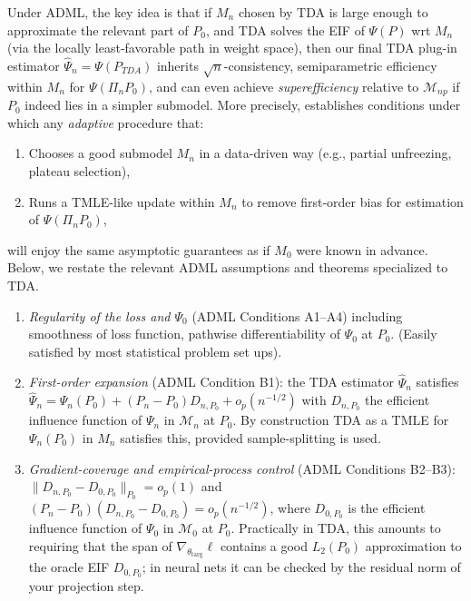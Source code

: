 \documentclass{article}
\theoremstyle{remark}
\begin{document}
Under ADML, the key idea is that if $M_n$ chosen by TDA is large enough to approximate the relevant part of $P_0$, and TDA solves the EIF of $\Psi(P)$ wrt $M_n$ (via the locally least-favorable path in weight space), then our final TDA plug-in estimator $\widehat{\Psi}_n=\Psi(P_{\textit{TDA}})$ inherits $\sqrt{n}$-consistency, semiparametric efficiency within $M_n$ for $\Psi(\Pi_nP_0)$, and can even achieve \emph{superefficiency} relative to $\mathcal{M}_{np}$ if $P_0$ indeed lies in a simpler submodel. More precisely, \cite{van2023adaptive} establishes conditions under which any \emph{adaptive} procedure that:

\begin{enumerate}[leftmargin=1em,itemsep=0pt]
\item Chooses a good submodel $M_n$ in a data-driven way (e.g., partial unfreezing, plateau selection),
\item Runs a TMLE-like update within $M_n$ to remove first-order bias for estimation of $\Psi(\Pi_nP_0)$,
\end{enumerate}

will enjoy the same asymptotic guarantees as if $M_0$ were known in advance.  Below, we restate the relevant ADML assumptions and theorems specialized to TDA.

\begin{enumerate} [leftmargin=1.5em,label=\textbf{(T\arabic*)}]
  \item\label{ass:A1A4}
        \emph{Regularity of the loss and $\Psi_0$}  
        (ADML Conditions A1–A4) including smoothness of loss function, pathwise differentiability of $\Psi_0$ at $P_0$. (Easily satisfied by most statistical problem set ups).
  \item\label{ass:B1}
        \emph{First-order expansion}  
        (ADML Condition B1):  
        the TDA estimator $\hat\Psi_n$ satisfies  
        $\hat\Psi_n=\Psi_n(P_0)+(P_n-P_0)D_{n,P_0}+o_p(n^{-1/2})$
        with $D_{n,P_0}$ the efficient influence function of
        $\Psi_n$ in $\mathcal{M}_n$ at $P_0$.  
        By construction TDA as a TMLE for $\Psi_n(P_0)$ in $M_n$ satisfies this, provided sample-splitting is used.
  \item\label{ass:B2B3}
        \emph{Gradient-coverage and empirical-process control}  
        (ADML Conditions B2–B3):  
        $\|D_{n,P_0}-D_{0,P_0}\|_{P_0}=o_p(1)$ and
        $(P_n-P_0)(D_{n,P_0}-D_{0,P_0})=o_p(n^{-1/2})$,
        where $D_{0,P_0}$ is the efficient influence function of
        $\Psi_0$ in $\mathcal{M}_0$ at $P_0$.  Practically in TDA, this amounts to requiring that the span of
        $\nabla_{\theta_{\mathrm{targ}}}\ell$ contains a good $L_2(P_0)$
        approximation to the oracle EIF $D_{0,P_0}$; in neural nets it can be checked by
        the residual norm of your projection step.
\end{enumerate}
\end{document}
